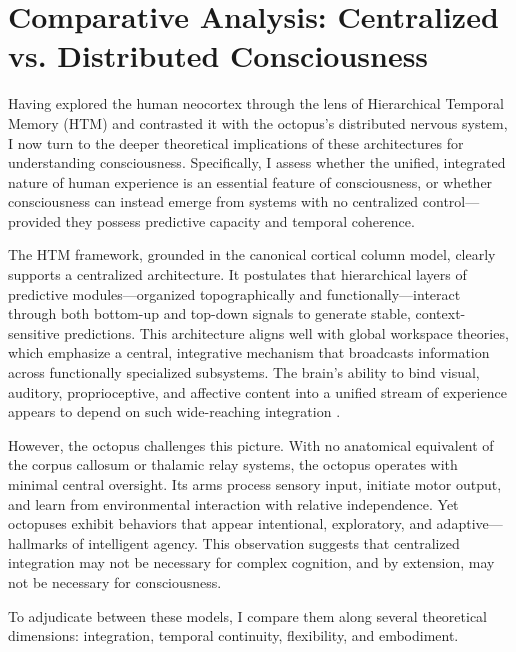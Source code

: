 \documentclass{article}
\begin{document}
\section{Comparative Analysis: Centralized vs. Distributed Consciousness}

Having explored the human neocortex through the lens of Hierarchical Temporal Memory (HTM) and contrasted it with the octopus's distributed nervous system, I now turn to the deeper theoretical implications of these architectures for understanding consciousness. Specifically, I assess whether the unified, integrated nature of human experience is an essential feature of consciousness, or whether consciousness can instead emerge from systems with no centralized control—provided they possess predictive capacity and temporal coherence.

The HTM framework, grounded in the canonical cortical column model, clearly supports a centralized architecture. It postulates that hierarchical layers of predictive modules—organized topographically and functionally—interact through both bottom-up and top-down signals to generate stable, context-sensitive predictions. This architecture aligns well with global workspace theories, which emphasize a central, integrative mechanism that broadcasts information across functionally specialized subsystems. The brain’s ability to bind visual, auditory, proprioceptive, and affective content into a unified stream of experience appears to depend on such wide-reaching integration \parencite{mountcastle1997columnar, clark2016surfing}.

However, the octopus challenges this picture. With no anatomical equivalent of the corpus callosum or thalamic relay systems, the octopus operates with minimal central oversight. Its arms process sensory input, initiate motor output, and learn from environmental interaction with relative independence. Yet octopuses exhibit behaviors that appear intentional, exploratory, and adaptive—hallmarks of intelligent agency. This observation suggests that centralized integration may not be necessary for complex cognition, and by extension, may not be necessary for consciousness.

To adjudicate between these models, I compare them along several theoretical dimensions: integration, temporal continuity, flexibility, and embodiment.
\end{document}
